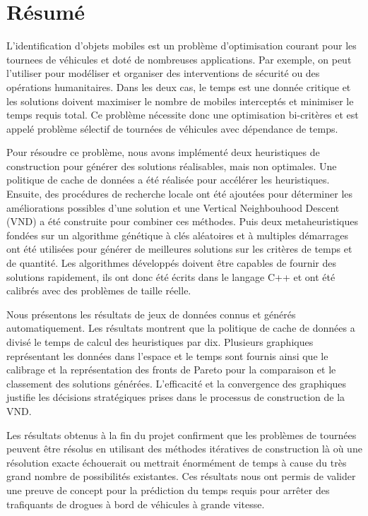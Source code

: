 \section*{Résumé}

L'identification d'objets mobiles est un problème d'optimisation courant pour les \glspl{tournee} de véhicules et doté de nombreuses applications. Par exemple, on peut l'utiliser pour modéliser et organiser des interventions de sécurité ou des opérations humanitaires. Dans les deux cas, le temps est une donnée critique et les solutions doivent maximiser le nombre de mobiles interceptés et minimiser le temps requis total. Ce problème nécessite donc une optimisation bi-critères et est appelé problème sélectif de tournées de véhicules avec dépendance de temps. 

Pour résoudre ce problème, nous avons implémenté deux \glspl{heuristique} de construction pour générer des solutions réalisables, mais non optimales. Une politique de cache de données a été réalisée pour accélérer les heuristiques. Ensuite, des procédures de recherche locale ont été ajoutées pour déterminer les améliorations possibles d'une solution et une Vertical Neighbouhood Descent (VND) a été construite pour combiner ces méthodes. Puis deux \glspl{metaheuristique} fondées sur un algorithme génétique à clés aléatoires et à multiples démarrages ont été utilisées pour générer de meilleures solutions sur les critères de temps et de quantité. Les algorithmes développés doivent être capables de fournir des solutions rapidement, ils ont donc été écrits dans le langage C++ et ont été calibrés avec des problèmes de taille réelle. 

Nous présentons les résultats de jeux de données connus et générés automatiquement. Les résultats montrent que la politique de cache de données a divisé le temps de calcul des heuristiques par dix. Plusieurs graphiques représentant les données dans l'espace et le temps sont fournis ainsi que le calibrage et la représentation des fronts de Pareto pour la comparaison et le classement des solutions générées. L'efficacité et la convergence des graphiques justifie les décisions stratégiques prises dans le processus de construction de la VND. 

Les résultats obtenus à la fin du projet confirment que les problèmes de tournées peuvent être résolus en utilisant des méthodes itératives de construction là où une résolution exacte échouerait ou mettrait énormément de temps à cause du très grand nombre de possibilités existantes. Ces résultats nous ont permis de valider une preuve de concept pour la prédiction du temps requis pour arrêter des trafiquants de drogues à bord de véhicules à grande vitesse.

